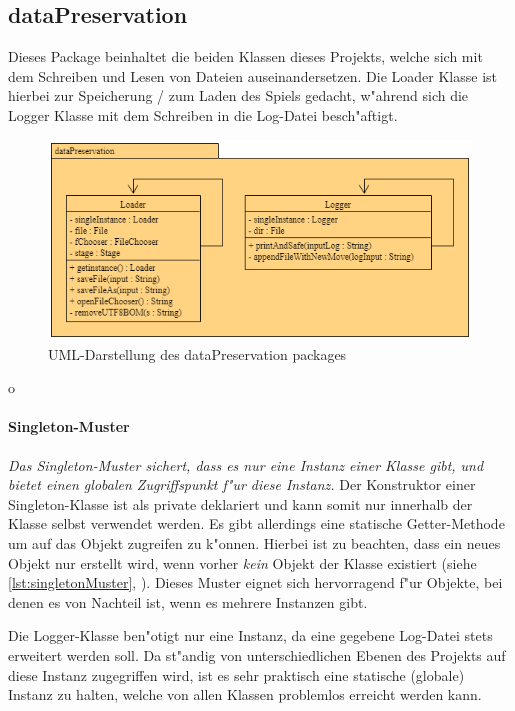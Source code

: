 \subsection{dataPreservation}
\label{ss:dataPreservation}
Dieses Package beinhaltet die beiden Klassen dieses Projekts, welche sich mit dem Schreiben und Lesen von Dateien auseinandersetzen. Die Loader Klasse ist hierbei zur Speicherung / zum Laden des Spiels gedacht, w"ahrend sich die Logger Klasse mit dem Schreiben in die Log-Datei besch"aftigt. 

\begin{figure}
	\centering
	\includegraphics{pics/dataPreservationPackage}
	\caption{UML-Darstellung des dataPreservation packages}
	\label{fig:dataPreservationPackage}
\end{figure}
o
\paragraph{Singleton-Muster}
\label{par:singletonMuster}
\emph{Das Singleton-Muster sichert, dass es nur eine Instanz einer Klasse gibt, und bietet einen globalen Zugriffspunkt f"ur diese Instanz.} \cite{Freeman2006}
Der Konstruktor einer Singleton-Klasse ist als private deklariert und kann somit nur innerhalb der Klasse selbst verwendet werden. Es gibt allerdings eine statische Getter-Methode um auf das Objekt zugreifen zu k"onnen. Hierbei ist zu beachten, dass ein neues Objekt nur erstellt wird, wenn vorher \emph{kein} Objekt der Klasse existiert (siehe \ref{lst:singletonMuster}, ). Dieses Muster eignet sich hervorragend f"ur Objekte, bei denen es von Nachteil ist, wenn es mehrere Instanzen gibt. 

Die Logger-Klasse ben"otigt nur eine Instanz, da eine gegebene Log-Datei stets erweitert werden soll. Da st"andig von unterschiedlichen Ebenen des Projekts auf diese Instanz zugegriffen wird, ist es sehr praktisch eine statische (globale) Instanz zu halten, welche von allen Klassen problemlos erreicht werden kann. 

